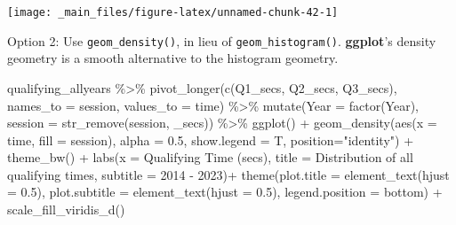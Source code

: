 \documentclass[
]{book}
\newenvironment{Shaded}{\begin{snugshade}}{\end{snugshade}}
\newcommand{\AttributeTok}[1]{\textcolor[rgb]{0.77,0.63,0.00}{#1}}
\newcommand{\FloatTok}[1]{\textcolor[rgb]{0.00,0.00,0.81}{#1}}
\newcommand{\FunctionTok}[1]{\textcolor[rgb]{0.00,0.00,0.00}{#1}}
\newcommand{\NormalTok}[1]{#1}
\newcommand{\SpecialCharTok}[1]{\textcolor[rgb]{0.00,0.00,0.00}{#1}}
\newcommand{\StringTok}[1]{\textcolor[rgb]{0.31,0.60,0.02}{#1}}
\begin{document}
\begin{center}\texttt{[image: \_main\_files/figure-latex/unnamed-chunk-42-1]} \end{center}

Option 2: Use \texttt{geom\_density()}, in lieu of \texttt{geom\_histogram()}. \textbf{ggplot}'s density geometry is a smooth alternative to the histogram geometry.

\begin{Shaded}
\begin{Highlighting}[]
\NormalTok{qualifying\_allyears }\SpecialCharTok{\%\textgreater{}\%}
  \FunctionTok{pivot\_longer}\NormalTok{(}\FunctionTok{c}\NormalTok{(}\StringTok{\textquotesingle{}Q1\_secs\textquotesingle{}}\NormalTok{, }\StringTok{\textquotesingle{}Q2\_secs\textquotesingle{}}\NormalTok{, }\StringTok{\textquotesingle{}Q3\_secs\textquotesingle{}}\NormalTok{),}
               \AttributeTok{names\_to =} \StringTok{\textquotesingle{}session\textquotesingle{}}\NormalTok{,}
               \AttributeTok{values\_to =} \StringTok{\textquotesingle{}time\textquotesingle{}}\NormalTok{) }\SpecialCharTok{\%\textgreater{}\%}
  \FunctionTok{mutate}\NormalTok{(}\AttributeTok{Year =} \FunctionTok{factor}\NormalTok{(Year),}
         \AttributeTok{session =} \FunctionTok{str\_remove}\NormalTok{(session, }\StringTok{\textquotesingle{}\_secs\textquotesingle{}}\NormalTok{)) }\SpecialCharTok{\%\textgreater{}\%}
  \FunctionTok{ggplot}\NormalTok{() }\SpecialCharTok{+}
  \FunctionTok{geom\_density}\NormalTok{(}\FunctionTok{aes}\NormalTok{(}\AttributeTok{x =}\NormalTok{ time, }\AttributeTok{fill =}\NormalTok{ session),}
                 \AttributeTok{alpha =} \FloatTok{0.5}\NormalTok{, }\AttributeTok{show.legend =}\NormalTok{ T,}
                 \AttributeTok{position=}\StringTok{"identity"}\NormalTok{) }\SpecialCharTok{+}
  \FunctionTok{theme\_bw}\NormalTok{() }\SpecialCharTok{+}
  \FunctionTok{labs}\NormalTok{(}\AttributeTok{x =} \StringTok{\textquotesingle{}Qualifying Time (secs)\textquotesingle{}}\NormalTok{,}
       \AttributeTok{title =} \StringTok{\textquotesingle{}Distribution of all qualifying times\textquotesingle{}}\NormalTok{,}
       \AttributeTok{subtitle =} \StringTok{\textquotesingle{}2014 {-} 2023\textquotesingle{}}\NormalTok{)}\SpecialCharTok{+}
  \FunctionTok{theme}\NormalTok{(}\AttributeTok{plot.title =} \FunctionTok{element\_text}\NormalTok{(}\AttributeTok{hjust =} \FloatTok{0.5}\NormalTok{),}
        \AttributeTok{plot.subtitle =} \FunctionTok{element\_text}\NormalTok{(}\AttributeTok{hjust =} \FloatTok{0.5}\NormalTok{),}
        \AttributeTok{legend.position =} \StringTok{\textquotesingle{}bottom\textquotesingle{}}\NormalTok{) }\SpecialCharTok{+}
  \FunctionTok{scale\_fill\_viridis\_d}\NormalTok{()}
\end{Highlighting}
\end{Shaded}
\end{document}
